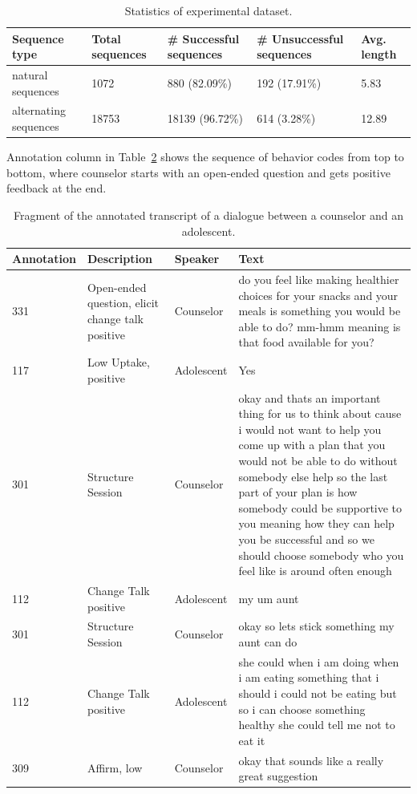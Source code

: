 \documentclass{amia}
\begin{document}
\begin{table}[h]
\centering
\caption{Statistics of experimental dataset.}
\label{tab:data_dist}
  \begin{tabular}{|l|l|l|l|l|}
  \hline
   \textbf{Sequence type} & \textbf{Total sequences}  & \textbf{\# Successful sequences}  & \textbf{\# Unsuccessful sequences} & \textbf{Avg. length} \\ \hline      
 natural sequences & 1072 & 880 (82.09\%) & 192 (17.91\%) & 5.83 \\\hline
alternating sequences & 18753 & 18139 (96.72\%) & 614 (3.28\%) & 12.89 \\\hline 
  \end{tabular}
\end{table} 

Annotation column in Table~\ref{tab:anno_examp} shows the sequence of behavior codes from top to bottom, where counselor starts with an open-ended question and gets positive feedback at the end. \\

\begin{table}[h]
\caption{Fragment of the annotated transcript of a dialogue between a counselor and an adolescent.}    
\label{tab:anno_examp}
\centering
\begin{tabular}{|l|p{3.6cm}|l|p{8cm}|}
\hline
Annotation  & Description & Speaker & Text \\\hline
331 &	Open-ended question, elicit change talk positive &	Counselor &	do you feel like making healthier choices for your snacks and your meals is something you would be able to do? mm-hmm meaning is that food available for you? \\\hline
117 &	Low Uptake, positive	& Adolescent &	Yes \\\hline
301 &	Structure Session	& Counselor &	okay and thats an important thing for us to think about cause i would not want to help you come up with a plan that you would not be able to do without somebody else help so the last part of your plan is how somebody could be supportive to you meaning how they can help you be successful and so we should choose somebody who you feel like is around often enough \\\hline
112 &	Change Talk positive	& Adolescent &	my um aunt \\\hline
301 &	Structure Session	& Counselor &	okay so lets stick something my aunt can do \\\hline
112 &	Change Talk positive &	Adolescent &	she could when i am doing when i am eating something that i should i could not be eating but so i can choose something healthy she could tell me not to eat it \\\hline
309 &	Affirm, low &	Counselor &	okay that sounds like a really great suggestion \\\hline
\end{tabular}
\end{table}  
\end{document}
